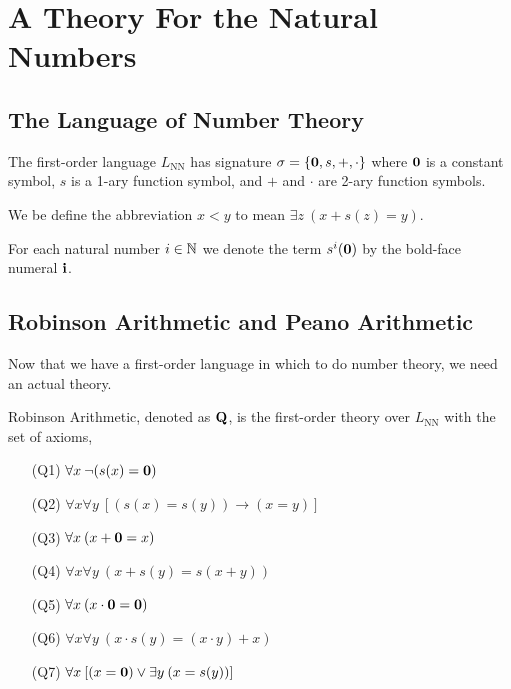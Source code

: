 \documentclass[12pt]{article}
\newcommand{\uq}[1]{\forall{#1} \:}
\renewcommand{\eq}[1]{\exists{#1} \:}
\begin{document}
\section{A Theory For the Natural Numbers}

\subsection{The Language of Number Theory}

\begin{definition}
The first-order language $L_{\text{NN}}$ has signature $\sigma = \{\bf{0}, s, +, \cdot\}$ where $\bf{0}$ is a constant symbol, $s$ is a 1-ary function symbol, and $+$ and $\cdot$ are 2-ary function symbols. 
\end{definition}

\begin{example}
We be define the abbreviation $x < y$ to mean $\eq{z} (x + s(z) = y)$. 
\end{example}

\begin{definition}
For each natural number $i \in \N$ we denote the term $s^i(\bf{0})$ by the bold-face numeral $\bf{i}$. 
\end{definition}

\subsection{Robinson Arithmetic and Peano Arithmetic}

Now that we have a first-order language in which to do number theory, we need an actual theory. 

\begin{definition}
Robinson Arithmetic, denoted as $\bf{Q}$, is the first-order theory over $L_{\text{NN}}$ with the set of axioms,
\begin{enumerate}
\item[(Q1)] $\uq{x} \neg (s(x) = \bf{0})$
\item[(Q2)] $\forall x \uq{y} [(s(x) = s(y)) \to (x = y)]$
\item[(Q3)] $\uq{x} (x + \bf{0} = x)$
\item[(Q4)] $\forall x \uq{y} (x + s(y) = s(x + y))$
\item[(Q5)] $\uq{x} (x \cdot \bf{0} = \bf{0})$
\item[(Q6)] $\forall x \uq{y} (x \cdot s(y) = (x \cdot y) + x)$
\item[(Q7)] $\uq{x} [(x = \bf{0}) \vee \eq{y} (x = s(y))]$ 
\end{enumerate}
\end{definition}
\end{document}
